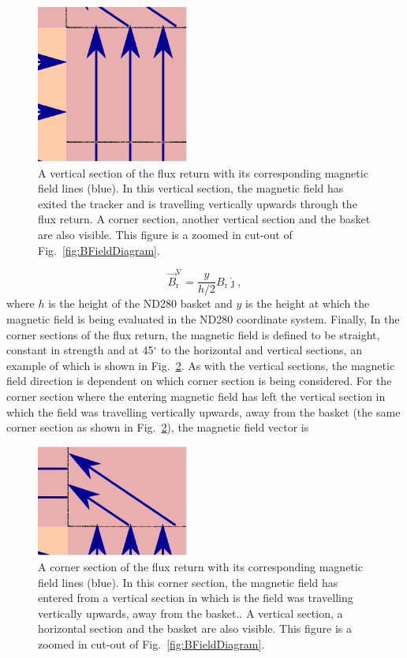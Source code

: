 \begin{figure}
  \centering
  \includegraphics[width=5cm]{images/magnetic_field/BFieldDiagramVerticalSection}
  \caption{A vertical section of the flux return with its corresponding magnetic field lines (blue).  In this vertical section, the magnetic field has exited the tracker and is travelling vertically upwards through the flux return. A corner section, another vertical section and the basket are also visible.  This figure is a zoomed in cut-out of Fig.~\ref{fig:BFieldDiagram}.}
  \label{fig:BFieldDiagramVerticalSection}
\end{figure}
\begin{equation}
  \overrightarrow{B}^{\textrm{V}}_{\textrm{r}} = \frac{y}{h/2}{B_{\textrm{r}}}\hat{\jmath},
  \label{eqn:VerticalReturnBFieldVector}
\end{equation}
where $h$ is the height of the ND280 basket and $y$ is the height at which the magnetic field is being evaluated in the ND280 coordinate system.  
\newline
\newline
Finally, In the corner sections of the flux return, the magnetic field is defined to be straight, constant in strength and at 45$^\circ$ to the horizontal and vertical sections, an example of which is shown in Fig.~\ref{fig:BFieldDiagramCornerSection}.  As with the vertical sections, the magnetic field direction is dependent on which corner section is being considered.  For the corner section where the entering magnetic field has left the vertical section in which the field was travelling vertically upwards, away from the basket (the same corner section as shown in Fig.~\ref{fig:BFieldDiagramCornerSection}), the magnetic field vector is
\begin{figure}
  \centering
  \includegraphics[width=5cm]{images/magnetic_field/BFieldDiagramCornerSection}
  \caption{A corner section of the flux return with its corresponding magnetic field lines (blue).  In this corner section, the magnetic field has entered from a vertical section in which is the field was travelling vertically upwards, away from the basket.. A vertical section, a horizontal section and the basket are also visible.  This figure is a zoomed in cut-out of Fig.~\ref{fig:BFieldDiagram}.}
  \label{fig:BFieldDiagramCornerSection}
\end{figure}
